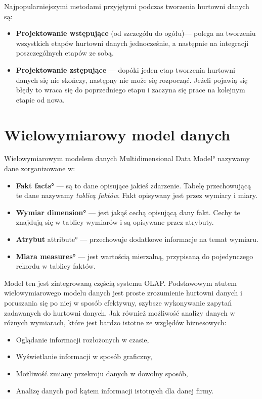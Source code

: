 Najpopularniejszymi metodami przyjętymi podczas tworzenia hurtowni danych są:
\begin{itemize}
 \item \textbf{Projektowanie wstępujące} (od szczegółu do ogółu)---
    polega na tworzeniu wszystkich etapów hurtowni danych
    jednocześnie, a następnie na integracji poszczególnych etapów ze sobą.
 \item \textbf{Projektowanie zstępujące} ---
    dopóki jeden etap tworzenia hurtowni danych się nie skończy, 
    następny nie może się rozpocząć.
    Jeżeli pojawią się błędy to wraca się do poprzedniego etapu i zaczyna się prace 
     na kolejnym etapie od nowa.
\end{itemize}



\section{Wielowymiarowy model danych}
Wielowymiarowym modelem danych \ang{Multidimensional Data Model} 
nazywamy dane zorganizowane w:
\begin{itemize}
 \item \textbf{Fakt \ang{facts}  } --- 
    są to dane opisujące jakieś zdarzenie. Tabelę przechowującą te dane nazywamy \textit{tablicą faktów}.
   Fakt opisywany jest przez wymiary i miary.
 \item \textbf{Wymiar \ang{dimension}} --- 
    jest jakąś cechą opisującą dany fakt. Cechy te znajdują się w tablicy wymiarów i są opisywane przez atrybuty.
 \item \textbf{Atrybut} \ang{ attribute}  --- 
    przechowuje dodatkowe informacje na temat wymiaru.
 \item \textbf{Miara \ang{measures}} --- 
    jest wartością mierzalną, przypisaną do pojedynczego rekordu w tablicy faktów. 
\end{itemize}

Model ten jest zintegrowaną częścią systemu OLAP.
Podstawowym atutem wielowymiarowego modelu danych jest proste zrozumienie hurtowni danych 
 i poruszania się po niej w sposób efektywny, szybsze wykonywanie zapytań zadawanych do hurtowni danych. 
Jak również możliwość analizy danych w różnych wymiarach, 
które jest bardzo istotne ze względów biznesowych:
\begin{itemize}
 \item Oglądanie informacji rozłożonych w czasie,
 \item Wyświetlanie informacji w sposób graficzny,
 \item Możliwość zmiany przekroju danych w dowolny sposób,
 \item Analizę danych pod kątem informacji istotnych dla danej firmy.
\end{itemize}

